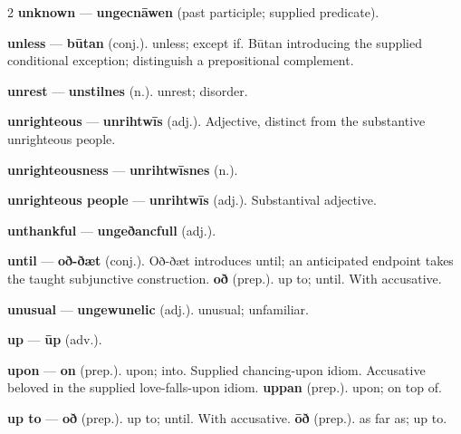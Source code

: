 \begin{multicols}{2}
\textbf{unknown} — \textbf{ungecnāwen} (past participle; supplied predicate).\par
\textbf{unless} — \textbf{būtan} (conj.). unless; except if. Būtan introducing the supplied conditional exception; distinguish a prepositional complement.\par
\textbf{unrest} — \textbf{unstilnes} (n.). unrest; disorder.\par
\textbf{unrighteous} — \textbf{unrihtwīs} (adj.). Adjective, distinct from the substantive unrighteous people.\par
\textbf{unrighteousness} — \textbf{unrihtwīsnes} (n.).\par
\textbf{unrighteous people} — \textbf{unrihtwīs} (adj.). Substantival adjective.\par
\textbf{unthankful} — \textbf{ungeðancfull} (adj.).\par
\textbf{until} — \textbf{oð-ðæt} (conj.). Oð-ðæt introduces until; an anticipated endpoint takes the taught subjunctive construction. \textbf{oð} (prep.). up to; until. With accusative.\par
\textbf{unusual} — \textbf{ungewunelic} (adj.). unusual; unfamiliar.\par
\textbf{up} — \textbf{ūp} (adv.).\par
\textbf{upon} — \textbf{on} (prep.). upon; into. Supplied chancing-upon idiom. Accusative beloved in the supplied love-falls-upon idiom. \textbf{uppan} (prep.). upon; on top of.\par
\textbf{up to} — \textbf{oð} (prep.). up to; until. With accusative. \textbf{ōð} (prep.). as far as; up to.\par

\end{multicols}
